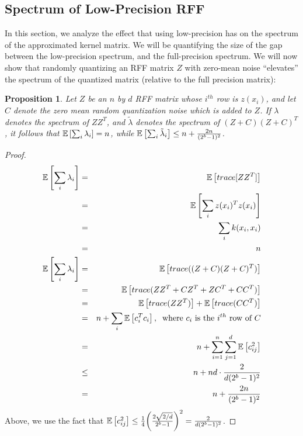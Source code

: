 \documentclass[12pt]{article}
\newcommand{\tlambda}{\tilde{\lambda}}
\newtheorem{proposition}[theorem]{Proposition}
\begin{document}
\subsection{Spectrum of Low-Precision RFF}
\label{sec:spectrum}
In this section, we analyze the effect that using low-precision has on the spectrum of the approximated kernel matrix.  We will be quantifying the size of the gap between the low-precision spectrum, and the full-precision spectrum.  We will now show that randomly quantizing an RFF matrix $Z$ with zero-mean noise ``elevates'' the spectrum of the quantized matrix (relative to the full precision matrix):
\begin{proposition}
	\label{prop:traceNoise}
	Let $Z$ be an $n$ by $d$ RFF matrix whose $i^{th}$ row is $z(x_i)$, and let $C$ denote the zero mean random quantization noise which is added to $Z$.  If $\lambda$ denotes the spectrum of $ZZ^T$, and $\tlambda$ denotes the spectrum of $(Z+C)(Z+C)^T$, it follows that $\expect{}{\sum_i \lambda_i} = n$, while $\expect{}{\sum_i \tlambda_i} \leq n + \frac{2n}{(2^b-1)^2}$.
\end{proposition}
\begin{proof}
	\begin{eqnarray*}
		\expect{}{\sum_i \lambda_i} &=& \expect{}{trace[ZZ^T]} \\
		&=& \expect{}{\sum_i z(x_i)^Tz(x_i)}\\
		&=& \sum_i k(x_i,x_i)\\
		&=& n \\
		\expect{}{\sum_i \lambda_i} &=& \expect{}{trace((Z+C)(Z+C)^T)} \\
		&=& 	\expect{}{trace(ZZ^T+CZ^T + ZC^T + CC^T)}  \\
		&=& \expect{}{trace(ZZ^T)} + \expect{}{trace(CC^T)} \\
		&=& n + \sum_i \expect{}{c_i^T c_i}, \;\;\text{where $c_i$ is the $i^{th}$ row of $C$}\\
		&=& n + \sum_{i=1}^n \sum_{j=1}^d \expect{}{c_{ij}^2} \\
		&\leq& n + nd\cdot \frac{2}{d(2^b-1)^2}\\
		&=& n + \frac{2n}{(2^b-1)^2}
	\end{eqnarray*}
	Above, we use the fact that $\expect{}{c_{ij}^2} \leq \frac{1}{4}\bigg(\frac{2\sqrt{2/d}}{2^b-1}\bigg)^2 = \frac{2}{d(2^b-1)^2}$.
\end{proof}
\end{document}
